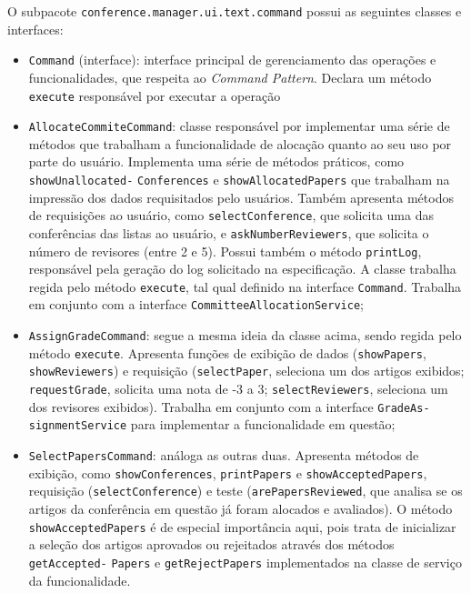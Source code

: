 \documentclass[a4paper, 12pt]{article}
\begin{document}
O subpacote \verb|conference.manager.ui.text.command| possui as seguintes classes e interfaces:
\begin{itemize}
\item \verb|Command| (interface): interface principal de gerenciamento das operações e funcionalidades, que respeita ao \emph{Command Pattern}. Declara um método \verb|execute| responsável por executar a operação
\item \verb|AllocateCommiteCommand|: classe responsável por implementar uma série de métodos que trabalham a funcionalidade de alocação quanto ao seu uso por parte do usuário. Implementa uma série de métodos práticos, como \verb|showUnallocated-| \verb|Conferences| e \verb|showAllocatedPapers| que trabalham na impressão dos dados requisitados pelo usuários. Também apresenta métodos de requisições ao usuário, como \verb|selectConference|, que solicita uma das conferências das listas ao usuário, e \verb|askNumberReviewers|, que solicita o número de revisores (entre 2 e 5). Possui também o método \verb|printLog|, responsável pela geração do log solicitado na especificação. A classe trabalha regida pelo método \verb|execute|, tal qual definido na interface \verb|Command|. Trabalha em conjunto com a interface \verb|CommitteeAllocationService|;

\item \verb|AssignGradeCommand|: segue a mesma ideia da classe acima, sendo regida pelo método \verb|execute|. Apresenta funções de exibição de dados (\verb|showPapers|, \verb|showReviewers|) e requisição (\verb|selectPaper|, seleciona um dos artigos exibidos; \verb|requestGrade|, solicita uma nota de -3 a 3; \verb|selectReviewers|, seleciona um dos revisores exibidos). Trabalha em conjunto com a interface \verb|GradeAs-| \verb|signmentService| para implementar a funcionalidade em questão;

\item \verb|SelectPapersCommand|: análoga as outras duas. Apresenta métodos de exibição, como \verb|showConferences|, \verb|printPapers| e \verb|showAcceptedPapers|, requisição (\verb|selectConference|) e teste (\verb|arePapersReviewed|, que analisa se os artigos da conferência em questão já foram alocados e avaliados). O método \verb|showAcceptedPapers| é de especial importância aqui, pois trata de inicializar a seleção dos artigos aprovados ou rejeitados através dos métodos \verb|getAccepted-| \verb|Papers| e \verb|getRejectPapers| implementados na classe de serviço da funcionalidade.
\end{itemize}
\end{document}
